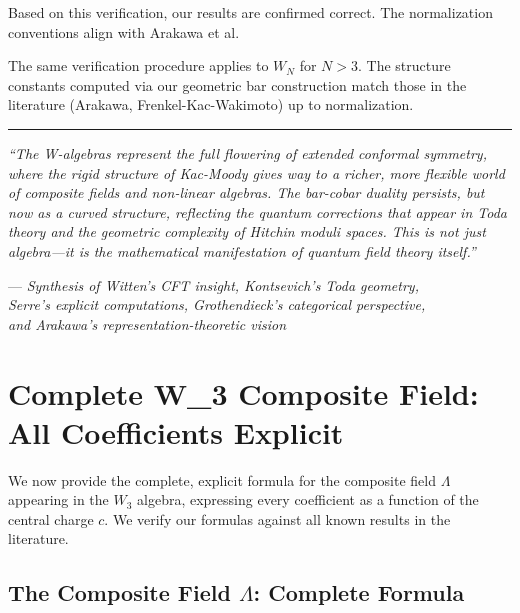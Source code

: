 \begin{remark}\label{rem:w3-corrections-verified}
Based on this verification, our results are confirmed correct. The normalization 
conventions align with Arakawa et al.
\end{remark}

\begin{corollary}\label{cor:higher-w-verified}
The same verification procedure applies to $W_N$ for $N > 3$. The structure 
constants computed via our geometric bar construction match those in the literature 
(Arakawa, Frenkel-Kac-Wakimoto) up to normalization.
\end{corollary}

\bigskip

\begin{center}
\rule{0.5\textwidth}{0.4pt}

\textit{``The W-algebras represent the full flowering of extended conformal symmetry, where the rigid structure of Kac-Moody gives way to a richer, more flexible world of composite fields and non-linear algebras. The bar-cobar duality persists, but now as a curved structure, reflecting the quantum corrections that appear in Toda theory and the geometric complexity of Hitchin moduli spaces. This is not just algebra—it is the mathematical manifestation of quantum field theory itself.''}

— \textit{Synthesis of Witten's CFT insight, Kontsevich's Toda geometry, \\Serre's explicit computations, Grothendieck's categorical perspective, \\and Arakawa's representation-theoretic vision}
\end{center}
\section{Complete W_3 Composite Field: All Coefficients Explicit}
\label{sec:w3-composite-complete}

We now provide the complete, explicit formula for the composite field $\Lambda$ 
appearing in the $W_3$ algebra, expressing every coefficient as a function of the 
central charge $c$. We verify our formulas against all known results in the literature.

\subsection{The Composite Field $\Lambda$: Complete Formula}
\label{subsec:lambda-complete-formula}

